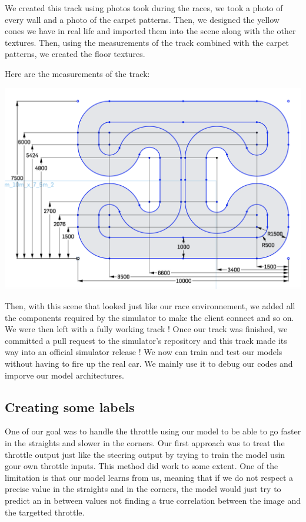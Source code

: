 \documentclass[12pt]{article}
\begin{document}
We created this track using photos took during the races, we took a photo of every wall and a photo of the carpet patterns. Then, we designed the yellow cones we have in real life and imported them into the scene along with the other textures. Then, using the measurements of the track combined with the carpet patterns, we created the floor textures.

Here are the measurements of the track: \\
\centerline{\includegraphics[width=15cm]{../../docs/track-measurements.png}} 

Then, with this scene that looked just like our race environnement, we added all the components required by the simulator to make the client connect and so on. We were then left with a fully working track ! Once our track was finished, we committed a pull request to the simulator's repository and this track made its way into an official simulator release ! We now can train and test our models without having to fire up the real car. We mainly use it to debug our codes and imporve our model architectures.

\subsection{Creating some labels}
One of our goal was to handle the throttle using our model to be able to go faster in the straights and slower in the corners. Our first approach was to treat the throttle output just like the steering output by trying to train the model usin gour own throttle inputs. This method did work to some extent. One of the limitation is that our model learns from us, meaning that if we do not respect a precise value in the straights and in the corners, the model would just try to predict an in between values not finding a true correlation between the image and the targetted throttle. \\
\end{document}
